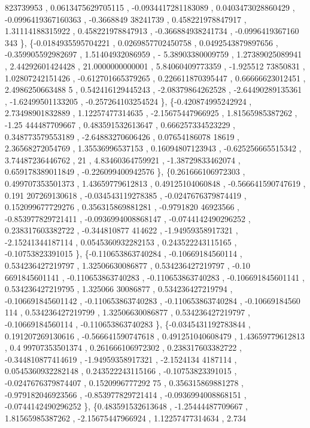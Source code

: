 \begin{DoxyCode}
      823739953 , 0.0613475629705115 , -0.0934417281183089 , 0.0403473028860429 , -0.0996419367160363 , -0.3668849
      38241739 , 0.458221978847917 ,  1.31114188315922 , 0.458221978847913 , -0.366884938241734 , -0.0996419367160
      343 \},
\{-0.0184935595704221 , 0.0269857702450758 , 0.0492543879897656 , -0.359905592982697 ,  1.51404932086959 , -
      5.38903380009759 ,  1.27389025089941 ,  2.44292601424428 ,  21.0000000000001 ,  5.84060409773359 , -1.925512
      73850831 ,  1.02807242151426 , -0.612701665379265 , 0.226611870395447 ,  0.66666623012451 ,  2.4986250663488
      5 , 0.542416129445243 , -2.08379864262528 , -2.64490289135361 , -1.62499501133205 , -0.257264103254524 \},
\{-0.420874995242924 ,  2.73498901832889 ,  1.12257477314635 , -2.15675447966925 ,  1.81565985387262 , -1.25
      444487709667 , 0.483591532613647 , 0.666257334523229 , 0.348773579553189 , -2.64883270606426 , 0.07654186078
      18619 ,  2.36568272054769 ,  1.35536996537153 ,  0.16094807123943 , -0.625256665515342 ,  3.74487236446762 ,
                      21 ,  4.83460364759921 , -1.38729833462074 , 0.659178389011849 , -0.226099400942576 \},
\{0.261666106972303 , 0.499707353501373 ,  1.43659779612813 ,  0.49125104060848 , -0.566641590747619 , 0.191
      207269130618 , -0.034543119278385 , -0.0247676379874419 , 0.152099677729276 , 0.356315869881281 , -0.9791820
      46923566 , -0.853977829721411 , -0.0936994008868147 , -0.0744142490296252 , 0.238317603382722 , -0.344810877
      414622 , -1.94959358917321 , -2.15241344187114 , 0.0545360932282153 , 0.243522243115165 , -0.10753823391015 
      \},
\{-0.110653863740284 , -0.10669184560114 , 0.534236427219797 ,  1.32506630086877 , 0.534236427219797 , -0.10
      6691845601141 , -0.110653863740283 , -0.110653863740283 , -0.106691845601141 , 0.534236427219795 ,  1.325066
      30086877 , 0.534236427219794 , -0.106691845601142 , -0.110653863740283 , -0.110653863740284 , -0.10669184560
      114 , 0.534236427219799 ,  1.32506630086877 , 0.534236427219797 , -0.10669184560114 , -0.110653863740283 \},
\{-0.0345431192783844 , 0.191207269130616 , -0.566641590747618 , 0.491251040608479 ,  1.43659779612813 , 0.4
      99707353501374 , 0.261666106972302 , 0.238317603382722 , -0.344810877414619 , -1.94959358917321 , -2.1524134
      4187114 , 0.0545360932282148 , 0.243522243115166 , -0.10753823391015 , -0.0247676379874407 , 0.1520996777292
      75 , 0.356315869881278 , -0.979182046923566 , -0.853977829721414 , -0.0936994008868151 , -0.0744142490296252
       \},
\{0.483591532613648 , -1.25444487709667 ,  1.81565985387262 , -2.15675447966924 ,  1.12257477314634 ,  2.734

\end{DoxyCode}

